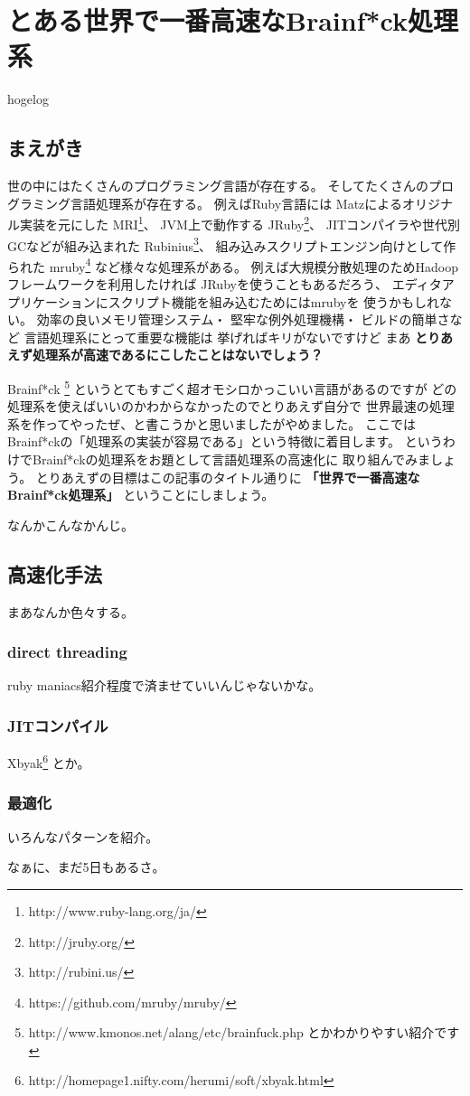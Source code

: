 
\cleardoublepage
\plainifnotempty

\chapter{とある世界で一番高速なBrainf*ck処理系}
\begin{flushright}
hogelog
\end{flushright}

\section{まえがき}
\lettrine{世}
の中にはたくさんのプログラミング言語が存在する。
そしてたくさんのプログラミング言語処理系が存在する。
例えばRuby言語には
Matzによるオリジナル実装を元にした
MRI\footnote{http://www.ruby-lang.org/ja/}、
JVM上で動作する
JRuby\footnote{http://jruby.org/}、
JITコンパイラや世代別GCなどが組み込まれた
Rubinius\footnote{http://rubini.us/}、
組み込みスクリプトエンジン向けとして作られた
mruby\footnote{https://github.com/mruby/mruby/}
など様々な処理系がある。
例えば大規模分散処理のためHadoopフレームワークを利用したければ
JRubyを使うこともあるだろう、
エディタアプリケーションにスクリプト機能を組み込むためにはmrubyを
使うかもしれない。
効率の良いメモリ管理システム・
堅牢な例外処理機構・
ビルドの簡単さなど
言語処理系にとって重要な機能は
挙げればキリがないですけど
まあ
{\LARGE \textbf{とりあえず処理系が高速であるにこしたことはないでしょう？}}

Brainf*ck
\footnote{http://www.kmonos.net/alang/etc/brainfuck.php とかわかりやすい紹介です}
というとてもすごく超オモシロかっこいい言語があるのですが
どの処理系を使えばいいのかわからなかったのでとりあえず自分で
世界最速の処理系を作ってやったぜ、と書こうかと思いましたがやめました。
ここではBrainf*ckの「処理系の実装が容易である」という特徴に着目します。
というわけでBrainf*ckの処理系をお題として言語処理系の高速化に
取り組んでみましょう。
とりあえずの目標はこの記事のタイトル通りに
{\LARGE \textbf{「世界で一番高速なBrainf*ck処理系」}}
ということにしましょう。

なんかこんなかんじ。

\section{高速化手法}
まあなんか色々する。

\subsection{direct threading}
ruby maniacs紹介程度で済ませていいんじゃないかな。

\subsection{JITコンパイル}
Xbyak\footnote{http://homepage1.nifty.com/herumi/soft/xbyak.html}
とか。

\subsection{最適化}
いろんなパターンを紹介。

なぁに、まだ5日もあるさ。


